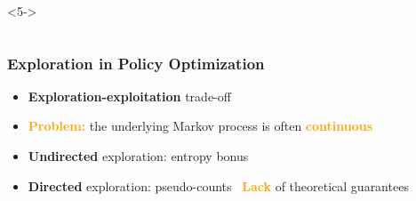 \documentclass[aspectratio=169, table]{beamer}
\newcommand{\enb}[1]{\textcolor{poliblue1}{\textbf{#1}}}
\newcommand{\eno}[1]{\textcolor{orange}{\textbf{#1}}}
\begin{document}
\begin{frame}[noframenumbering]
\begin{columns}
\begin{column}{.35\textwidth}
	<5->
\end{column}
\end{columns}
\end{frame}

\begin{frame} 
\frametitle{Exploration in Policy Optimization} 
\begin{itemize}
	\item \enb{Exploration-exploitation} trade-off
	\item \eno{Problem:} the underlying Markov process is often \eno{continuous}
	\item \enb{Undirected} exploration: entropy bonus~\citep{haarnoja2018soft}
	\item \enb{Directed} exploration: pseudo-counts~\citep{bellemare2016unifying}
	\vfill
	\centering
	{\Large\eno{Lack} of theoretical guarantees}
\end{itemize}
\end{frame}
\end{document}
